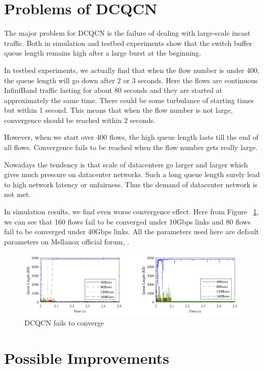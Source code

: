 \documentclass[12pt,a4paper]{article}
\begin{document}
\section{Problems of DCQCN}
The major problem for DCQCN is the failure of dealing with large-scale incast traffic.
Both in simulation and testbed experiments show that the switch buffer queue length remains high after a large burst at the beginning.

In testbed experiments, we actually find that when the flow number is under 400, the queue length will go down after 2 or 3 seconds.
Here the flows are continuous InfiniBand traffic lasting for about 80 seconds and they are started at approximately the same time.
There could be some turbulance of starting times but within 1 second.
This means that when the flow number is not large, convergence should be reached within 2 seconds.

However, when we start over 400 flows, the high queue length lasts till the end of all flows.
Convergence fails to be reached when the flow number gets really large.

Nowadays the tendency is that scale of datacenters go larger and larger which gives much pressure on datacenter networks.
Such a long queue length surely lead to high network latency or unfairness.
Thus the demand of datacenter network is not met.

In simulation results, we find even worse convergence effect.
Here from Figure ~\ref{fig:DCQCNfail}, we can see that 160 flows fail to be converged under 10Gbps links and 80 flows fail to 
be converged under 40Gbps links.
All the parameters used here are default parameters on Mellanox official forum, \cite{MellanoxOfficial}.

\begin{figure}[h]
	\begin{center}
		\includegraphics[width=6in]{DCQCNfail}
		\caption{DCQCN fails to converge}
		\label{fig:DCQCNfail}
	\end{center}
\end{figure}

\section{Possible Improvements}
\end{document}
